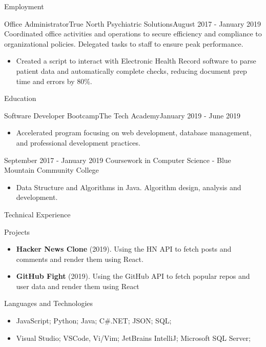 \documentclass[]{mcdowellcv}
\begin{document}
\begin{cvsection}{Employment}
		\begin{cvsubsection}{Office Administrator}{True North Psychiatric Solutions}{August 2017 - January 2019}		
			Coordinated office activities and operations to secure efficiency and compliance to organizational policies. Delegated tasks to staff to ensure peak performance.
			\begin{itemize}
				\item Created a script to interact with Electronic Health Record software to parse patient data and automatically complete checks, reducing document prep time and errors by 80\%.
			\end{itemize}
		\end{cvsubsection}
	\end{cvsection}
	
	\begin{cvsection}{Education}
		\begin{cvsubsection}{Software Developer Bootcamp}{The Tech Academy}{January 2019 - June 2019}
			\begin{itemize}
				\item Accelerated program focusing on web development, database management, and professional development practices.
			\end{itemize}
		\end{cvsubsection}
		\begin{cvsubsection}{}{}{September 2017 - January 2019}
			Coursework in Computer Science - Blue Mountain Community College
			\begin{itemize}
				\item Data Structure and Algorithms in Java. Algorithm design, analysis and development.
			\end{itemize}
		\end{cvsubsection}
	\end{cvsection}
	
	\begin{cvsection}{Technical Experience}
		\begin{cvsubsection}{Projects}{}{}
			\begin{itemize}
				\item \textbf{Hacker News Clone} (2019). Using the HN API to fetch posts and comments and render them using React.
				\item \textbf{GitHub Fight} (2019). Using the GitHub API to fetch popular repos and user data and render them using React
			\end{itemize}
		\end{cvsubsection}
	\end{cvsection}
	
	\begin{cvsection}{Languages and Technologies}
		\begin{cvsubsection}{}{}{}	
			\begin{itemize}
				\item JavaScript; Python; Java; C\#.NET; JSON; SQL; 
				\item Visual Studio; VSCode, Vi/Vim; JetBrains IntelliJ; Microsoft SQL Server;
			\end{itemize}
		\end{cvsubsection}
	\end{cvsection}
	
\end{document}
